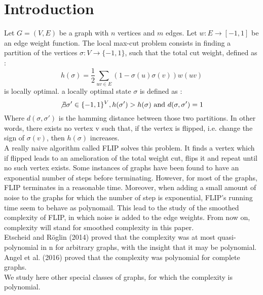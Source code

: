 \section{Introduction}

Let $G = (V,E)$ be a graph with $n$ vertices and $m$ edges.  Let $w : E \rightarrow [-1, 1]$ be an edge weight function. The local max-cut problem consists in finding a partition of the vertices $\sigma : V \rightarrow \{-1,1\}$, such that the total cut weight, defined as :
\begin{equation*}
h(\sigma) = \dfrac{1}{2}\sum_{uv \in E}(1 - \sigma(u)\sigma(v))w(uv)
\end{equation*}
is locally optimal. a locally optimal state $\sigma$ is defined as :
\begin{equation*}
\not \exists \sigma' \in \{-1, 1\}^V,  h(\sigma') > h(\sigma) \text{ and } d(\sigma, \sigma') = 1
\end{equation*}
Where $d(\sigma, \sigma')$ is the hamming distance between those two partitions. In other words, there exists no vertex v such that, if the vertex is flipped, i.e. change the sign of $\sigma(v)$, then $h(\sigma)$ increases.\\ 

A really naive algorithm called FLIP solves this problem. It finds a vertex which if flipped leads to an amelioration of the total weight cut, flips it and repeat until no such vertex exists. Some instances of graphs have been found to have an exponential number of steps before terminating. However, for most of the graphs, FLIP terminates in a reasonable time. Moreover, when adding a small amount of noise to the graphs for which the number of step is exponential, FLIP's running time seem to behave as polynomail. This lead to the study of the smoothed complexity of FLIP, in which noise is added to the edge weights. From now on, complexity will stand for smoothed complexity in this paper. \\

Etscheid and Röglin (2014) \cite{Roglin2014} proved that the complexity was at most quasi-polynomial in n for arbitrary graphs, with the insight that it may be polynomial. Angel et al. (2016) \cite{angel2016local} proved that the complexity was polynomial for complete graphs. \\
We study here other special classes of graphs, for which the complexity is polynomial.